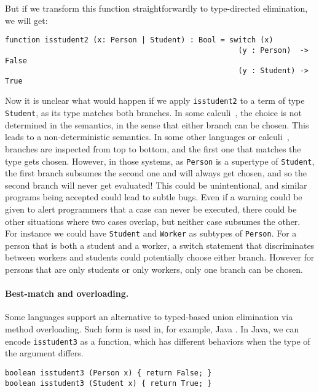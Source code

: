 \noindent But if we transform this function straightforwardly to type-directed
elimination, we will get:

\begin{lstlisting}
function isstudent2 (x: Person | Student) : Bool = switch (x)
                                                     (y : Person)  -> False
                                                     (y : Student) -> True
\end{lstlisting}

\noindent Now it is unclear what would happen if we apply \lstinline{isstudent2}
to a term of type \lstinline{Student}, as its type matches both branches. In
some calculi~\citep{dunfield2014elaborating}, the choice is not determined in
the semantics, in the sense that either branch can be chosen. This leads to a
non-deterministic semantics. In some other languages or
calculi~\citep{castagna:settheoretic}, branches are inspected from top to
bottom, and the first one that matches the type gets chosen. However, in those
systems, as \lstinline{Person} is a supertype of \lstinline{Student}, the first
branch subsumes the second one and will always get chosen, and so the second
branch will never get evaluated! This could be unintentional, and similar
programs being accepted could lead to subtle bugs. Even if a warning could be
given to alert programmers that a case can never be executed, there could be
other situations where two cases overlap, but neither case subsumes the other.
For instance we could have \lstinline{Student} and \lstinline{Worker} as
subtypes of \lstinline{Person}. For a person that is both a student and a
worker, a switch statement that discriminates between workers and students could
potentially choose either branch. However for persons that are only students or
only workers, only one branch can be chosen.

\paragraph{Best-match and overloading.}
Some languages support an alternative to typed-based union elimination via method
overloading. Such form is used in, for example, Java \cite{javadoc}. In Java, we
can encode \lstinline{isstudent3} as a function, which has different
behaviors when the type of the argument differs.

\begin{lstlisting}
boolean isstudent3 (Person x) { return False; }
boolean isstudent3 (Student x) { return True; }
\end{lstlisting}

